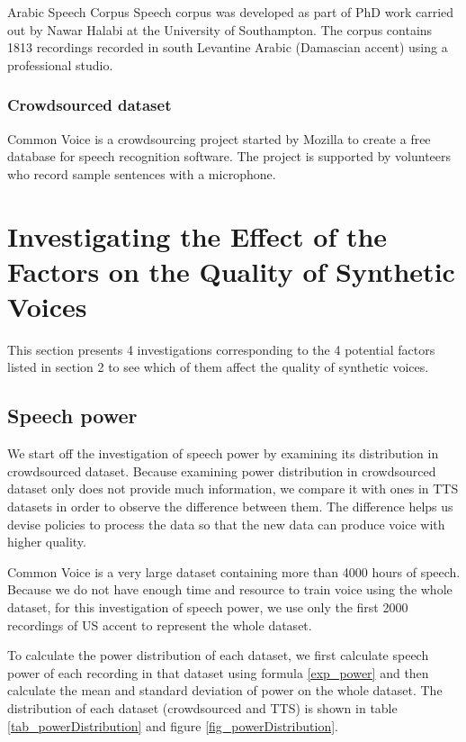 \documentclass[12pt]{article}
\begin{document}
Arabic Speech Corpus Speech corpus was developed as part of PhD work carried out by Nawar Halabi at the University of Southampton. The corpus contains 1813 recordings recorded in south Levantine Arabic (Damascian accent) using a professional studio.

\subsubsection{Crowdsourced dataset}

Common Voice is a crowdsourcing project started by Mozilla to create a free database for speech recognition software. The project is supported by volunteers who record sample sentences with a microphone.



\clearpage
\section{Investigating the Effect of the Factors on the Quality of Synthetic Voices}\label{sec_investigations}
This section presents 4 investigations corresponding to the 4 potential factors listed in section 2 to see which of them affect the quality of synthetic voices.

\subsection{Speech power}

We start off the investigation of speech power by examining its distribution in crowdsourced dataset. Because examining power distribution in crowdsourced dataset only does not provide much information, we compare it with ones in TTS datasets in order to observe the difference between them. The difference helps us devise policies to process the data so that the new data can produce voice with higher quality.

Common Voice is a very large dataset containing more than 4000 hours of speech. Because we do not have enough time and resource to train voice using the whole dataset, for this investigation of speech power, we use only the first 2000 recordings of US accent to represent the whole dataset.

To calculate the power distribution of each dataset, we first calculate speech power of each recording in that dataset using formula \ref{exp_power} and then calculate the mean and standard deviation of power on the whole dataset. The distribution of each dataset (crowdsourced and TTS) is shown in table \ref{tab_powerDistribution} and figure \ref{fig_powerDistribution}.
\end{document}
